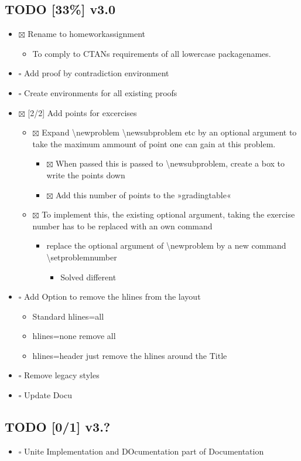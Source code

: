 \documentclass[11pt]{article}
\begin{document}
\subsection{{\bfseries\sffamily TODO} [33\%] v3.0}
\label{sec-3-1}
\begin{itemize}
\item $\boxtimes$ Rename to homeworkassignment
\begin{itemize}
\item To comply to CTANs requirements of all lowercase packagenames.
\end{itemize}
\item $\square$ Add proof by contradiction environment
\item $\square$ Create environments for all existing proofs
\item $\boxtimes$ [2/2] Add points for excercises
\begin{itemize}
\item $\boxtimes$ Expand \textbackslash{}newproblem \textbackslash{}newsubproblem etc
by an optional argument to take the maximum ammount of point one
can gain at this problem. 
\begin{itemize}
\item $\boxtimes$ When passed this is passed to \textbackslash{}newsubproblem,
create a box to write the points down
\item $\boxtimes$ Add this number of points to the »gradingtable«
\end{itemize}
\item $\boxtimes$ To implement this, the existing optional argument, taking
the exercise number has to be replaced with an own command
\begin{itemize}
\item replace the optional argument of
\textbackslash{}newproblem by a new command
\textbackslash{}setproblemnumber
\begin{itemize}
\item Solved different
\end{itemize}
\end{itemize}
\end{itemize}
\item $\square$ Add Option to remove the hlines from the layout
\begin{itemize}
\item Standard hlines=all
\item hlines=none remove all
\item hlines=header just remove the hlines around the Title
\end{itemize}
\item $\square$ Remove legacy styles
\item $\square$ Update Docu
\end{itemize}
\subsection{{\bfseries\sffamily TODO} [0/1] v3.?}
\label{sec-3-2}
\begin{itemize}
\item $\square$ Unite Implementation and DOcumentation part of Documentation
\end{itemize}
\end{document}
